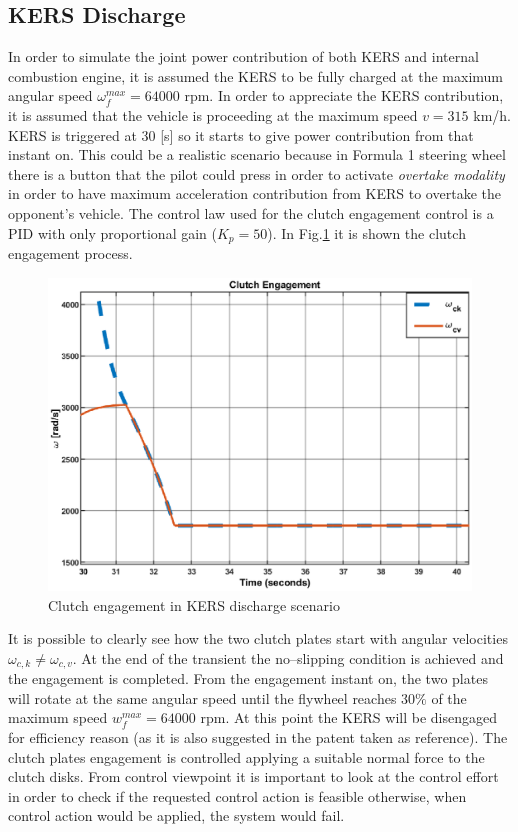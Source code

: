 \documentclass[11pt]{article}
\begin{document}
\subsection{KERS Discharge}

In order to simulate the joint power contribution of both KERS and internal combustion engine, it is assumed the KERS to be fully charged at the maximum angular speed $ \omega_f^{max}=64000$ rpm. In order to appreciate the KERS contribution, it is assumed that the vehicle is proceeding at the maximum speed $ v = 315$ km/h. KERS is triggered at $30$ [s] so it starts to give power contribution from that instant on. This could be a realistic scenario because in Formula 1 steering wheel there is a button that the pilot could press in order to activate \textit{overtake modality} in order to have maximum acceleration contribution from KERS to overtake the opponent's vehicle. The control law used for the clutch engagement control is a PID with only proportional gain ($K_p = 50$). In Fig.\ref{fig: clutchengdis} it is shown the clutch engagement process.

\begin{figure}[H]
	\centering
	\includegraphics[width=.6\textwidth]{Images/Results_Dynamics/Discharge/Clutch_zoom.eps}
	\caption{Clutch engagement in KERS discharge scenario}
	\label{fig: clutchengdis}
\end{figure}

It is possible to clearly see how the two clutch plates start with angular velocities $\omega_{c,k} \neq \omega_{c,v}$. At the end of the transient the no--slipping condition is achieved and the engagement is completed. From the engagement instant on, the two plates will rotate at the same angular speed until the flywheel reaches $30\%$ of the maximum speed $w_f^{max}=64000$ rpm. At this point the KERS will be disengaged for efficiency reason (as it is also suggested in the patent taken as reference). The clutch plates engagement is controlled applying a suitable normal force to the clutch disks. From control viewpoint it is important to look at the control effort in order to check if the requested control action is feasible otherwise, when control action would be applied, the system would fail.
\end{document}
